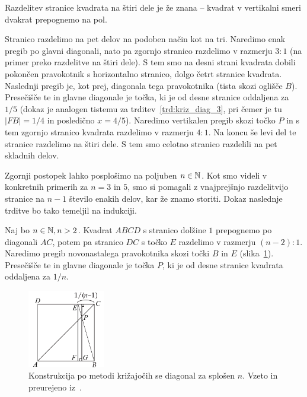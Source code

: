 Razdelitev stranice kvadrata na štiri dele je že znana -- kvadrat v vertikalni smeri dvakrat prepognemo na pol.

Stranico razdelimo na pet delov na podoben način kot na tri. Naredimo enak pregib po glavni diagonali, nato pa zgornjo stranico razdelimo v razmerju $3:1$ (na primer preko razdelitve na štiri dele). S tem smo na desni strani kvadrata dobili pokončen pravokotnik s horizontalno stranico, dolgo četrt stranice kvadrata. Naslednji pregib je, kot prej, diagonala tega pravokotnika (tista skozi oglišče $B$). Presečišče te in glavne diagonale je točka, ki je od desne stranice oddaljena za $1/5$ (dokaz je analogen tistemu za trditev~\ref{trd:kriz_diag_3}, pri čemer je tu $|FB| = 1/4$ in posledično $x = 4/5$). Naredimo vertikalen pregib skozi točko $P$ in s tem zgornjo stranico kvadrata razdelimo v razmerju $4:1$. Na koncu še levi del te stranice razdelimo na štiri dele. S tem smo celotno stranico razdelili na pet skladnih delov.

Zgornji postopek lahko posplošimo na poljuben $n \in \mathbb N$. Kot smo videli v konkretnih primerih za $n = 3$ in $5$, smo si pomagali z vnajprejšnjo razdelitvijo stranice na $n-1$ število enakih delov, kar že znamo storiti. Dokaz naslednje trditve bo tako temeljil na indukciji.

\begin{trditev}
    Naj bo $n \in \mathbb N, n > 2$. Kvadrat $ABCD$ s stranico dolžine $1$ prepognemo po diagonali $AC$, potem pa stranico $DC$ s točko $E$ razdelimo v razmerju $(n-2):1$. Naredimo pregib novonastalega pravokotnika skozi točki $B$ in $E$ (slika~\ref{fig:razdelitev_stranice_n1}). Presečišče te in glavne diagonale je točka $P$, ki je od desne stranice kvadrata oddaljena za $1/n$.
\end{trditev}
\begin{figure}[h]
    \centering
    \includegraphics[width=0.3\textwidth]{images/razdelitev_stranice_n1.png}
    \caption[Metoda križajočih diagonal]{Konstrukcija po metodi križajočih se diagonal za splošen $n$. Vzeto in preurejeno iz~\cite[str. 38]{hull2013}.}
    \label{fig:razdelitev_stranice_n1}
\end{figure}

